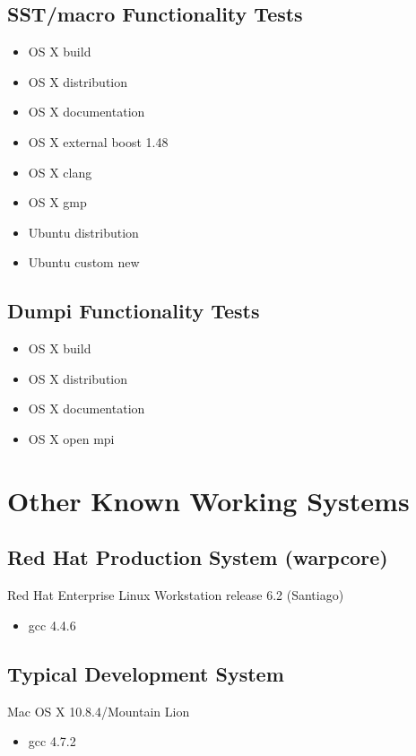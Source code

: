 \subsection{SST/macro Functionality Tests}
\begin{itemize}
\item OS X build
\item OS X distribution
\item OS X documentation
\item OS X external boost 1.48
\item OS X clang 
\item OS X gmp
\item Ubuntu distribution
\item Ubuntu custom new
\end{itemize}

\subsection{Dumpi Functionality Tests}
\begin{itemize}
\item OS X build
\item OS X distribution
\item OS X documentation
\item OS X open mpi
\end{itemize}

\section{Other Known Working Systems}
\label{sec:otherworking}

\subsection{Red Hat Production System (warpcore)}
Red Hat Enterprise Linux Workstation release 6.2 (Santiago)
\begin{itemize}
\item gcc 4.4.6
\end{itemize}

\subsection{Typical Development System}
Mac OS X 10.8.4/Mountain Lion
\begin{itemize}
\item gcc 4.7.2
\end{itemize}

